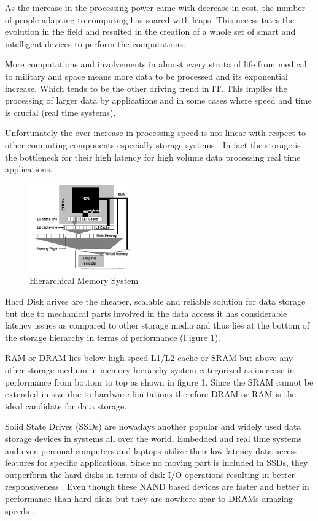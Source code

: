 \documentclass[10pt]{article} %
\begin{document}
As the increase in the processing power came with decrease in cost, the number of people adapting to computing has soared with leaps. This necessitates the evolution in the field and resulted in the creation of a whole set of smart and intelligent devices to perform the computations. 

More computations and involvements in almost every strata of life from medical to military and space means more data to be processed and its exponential increase. Which tends to be the other driving trend in IT. This implies the processing of larger data by applications and in some cases where speed and time is crucial (real time systems).

Unfortunately the ever increase in processing speed is not linear with respect to other computing components especially storage systems \cite{boncz1999database}. In fact the storage is the bottleneck for their high latency for high volume data processing real time applications. 

\begin{figure}
  \begin{center}
    \includegraphics[width=0.4\textwidth]{./pictures/Fig1}
  \end{center}
  \caption{Hierarchical Memory System}
\end{figure}

Hard Disk drives are the cheaper, scalable and reliable solution for data storage but due to mechanical parts involved in the data access it has considerable latency issues as compared to other storage media and thus lies at the bottom of the storage hierarchy in terms of performance (Figure 1).

RAM or DRAM lies below high speed L1/L2 cache or SRAM but above any other storage medium in memory hierarchy system categorized as increase in performance from bottom to top as shown in figure 1. Since the SRAM cannot be extended in size due to hardware limitations therefore DRAM or RAM is the ideal candidate for data storage.

Solid State Drives (SSDs) are nowadays another popular and widely used data storage devices in systems all over the world. Embedded and real time systems and even personal computers and laptops utilize their low latency data access features for specific applications. Since no moving part is included in SSDs, they outperform the hard disks in terms of disk I/O operations resulting in better responsiveness \cite{Mcobject-Myths}. Even though these NAND based devices are faster and better in performance than hard disks but they are nowhere near to DRAMs amazing speeds \cite{ssds}. 
\end{document}
